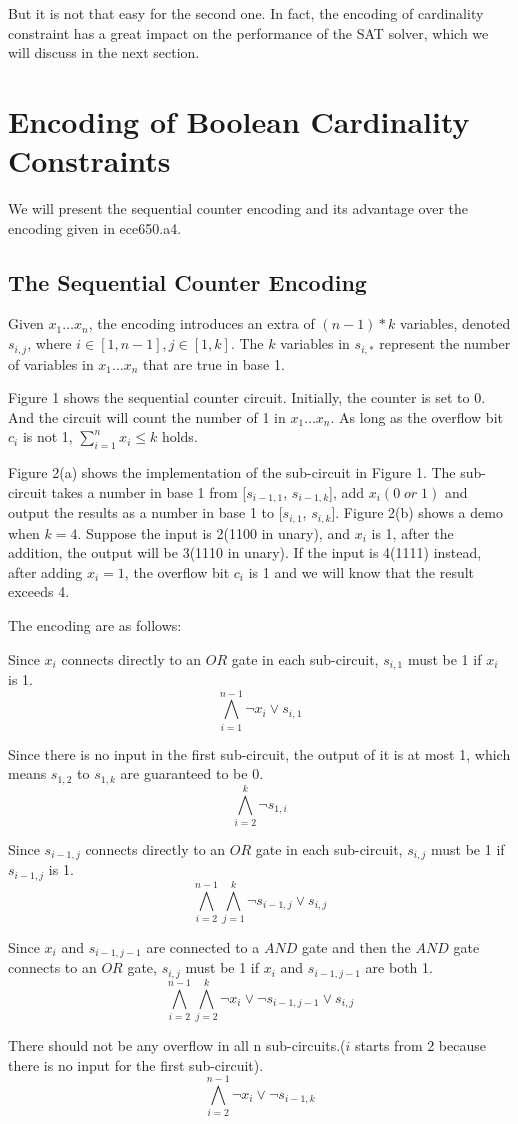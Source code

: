 \documentclass[11pt]{article}
\begin{document}
But it is not that easy for the second one. In fact, the encoding of cardinality constraint has a great impact on the performance of the SAT solver, which we will discuss in the next section.

\section{Encoding of Boolean Cardinality Constraints}\label{section-encoding}
We will present the sequential counter encoding and its advantage over the encoding given in ece650.a4.
\subsection{The Sequential Counter Encoding}
Given $x_1\ldots x_n$, the encoding introduces an extra of $(n-1)*k$ variables, denoted $s_{i,j}$, where $i \in [1,n-1], j\in [1,k]$. The $k$ variables in $s_{i,*}$ represent the number of variables in $x_1\ldots x_n$ that are true in base 1.

Figure 1 shows the sequential counter circuit. Initially, the counter is set to 0. And the circuit will count the number of 1 in $x_1\ldots x_n$. As long as the overflow bit $c_i$ is not 1, $\sum\limits_{i=1}^{n}x_i\leq k$ holds.

Figure 2(a) shows the implementation of the sub-circuit in Figure 1. The sub-circuit takes a number in base 1 from [$s_{i-1,1}$, $s_{i-1,k}$], add $x_i(0\;or\;1)$ and output the results as a number in base 1 to [$s_{i,1}$, $s_{i,k}$]. Figure 2(b) shows a demo when $k=4$. Suppose the input is 2(1100 in unary), and $x_i$ is 1, after the addition, the output will be 3(1110 in unary). If the input is 4(1111) instead, after adding $x_i=1$, the overflow bit $c_i$ is 1 and we will know that the result exceeds 4.

The encoding are as follows:

Since $x_i$ connects directly to an $OR$ gate in each sub-circuit, $s_{i,1}$ must be 1 if $x_i$ is 1.\[\bigwedge\limits_{i=1}^{n-1} \neg x_i \lor s_{i,1}\]

Since there is no input in the first sub-circuit, the output of it is at most 1, which means $s_{1,2}$ to $s_{1,k}$ are guaranteed to be 0.\[\bigwedge\limits_{i=2}^{k} \neg s_{1,i}\]

Since $s_{i-1,j}$ connects directly to an $OR$ gate in each sub-circuit, $s_{i,j}$ must be 1 if $s_{i-1,j}$ is 1.\[\bigwedge\limits_{i=2}^{n-1}\bigwedge\limits_{j=1}^{k}\neg s_{i-1,j} \lor s_{i,j}\]

Since $x_i$ and $s_{i-1,j-1}$ are connected to a $AND$ gate and then the $AND$ gate connects to an $OR$ gate, $s_{i,j}$ must be 1 if $x_i$ and $s_{i-1,j-1}$ are both 1.\[\bigwedge\limits_{i=2}^{n-1}\bigwedge\limits_{j=2}^{k}\neg x_i\lor\neg s_{i-1,j-1} \lor s_{i,j}\]

There should not be any overflow in all n sub-circuits.($i$ starts from 2 because there is no input for the first sub-circuit).\[\bigwedge\limits_{i=2}^{n-1}\neg x_i\lor\neg s_{i-1,k}\]
\end{document}
